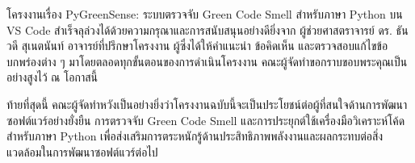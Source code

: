 \begin{acknowledgement}

    โครงงานเรื่อง PyGreenSense: ระบบตรวจจับ Green Code Smell สำหรับภาษา Python บน VS Code สำเร็จลุล่วงได้ด้วยความกรุณาและการสนับสนุนอย่างดียิ่งจาก ผู้ช่วยศาสตราจารย์ ดร. ธันวดี สุเนตนันท์ อาจารย์ที่ปรึกษาโครงงาน ผู้ซึ่งได้ให้คำแนะนำ ข้อคิดเห็น และตรวจสอบแก้ไขข้อบกพร่องต่าง ๆ มาโดยตลอดทุกขั้นตอนของการดำเนินโครงงาน คณะผู้จัดทำขอกราบขอบพระคุณเป็นอย่างสูงไว้ ณ โอกาสนี้

    ท้ายที่สุดนี้ คณะผู้จัดทำหวังเป็นอย่างยิ่งว่าโครงงานฉบับนี้จะเป็นประโยชน์ต่อผู้ที่สนใจด้านการพัฒนาซอฟต์แวร์อย่างยั่งยืน การตรวจจับ Green Code Smell และการประยุกต์ใช้เครื่องมือวิเคราะห์โค้ดสำหรับภาษา Python เพื่อส่งเสริมการตระหนักรู้ด้านประสิทธิภาพพลังงานและผลกระทบต่อสิ่งแวดล้อมในการพัฒนาซอฟต์แวร์ต่อไป

\end{acknowledgement}

